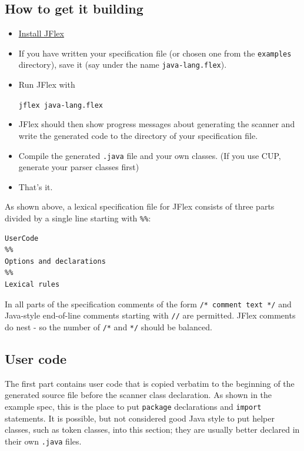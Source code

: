 \subsection{How to get it building}\label{how-to-get-it-building}

\begin{itemize}
\item
  \hyperref[Installing]{Install JFlex}
\item
  If you have written your specification file (or chosen one from the
  \texttt{examples} directory), save it (say under the name
  \texttt{java-lang.flex}).
\item
  Run JFlex with

  \texttt{jflex\ java-lang.flex}
\item
  JFlex should then show progress messages about generating the scanner
  and write the generated code to the directory of your specification
  file.
\item
  Compile the generated \texttt{.java} file and your own classes. (If
  you use CUP, generate your parser classes first)
\item
  That's it.
\end{itemize}


As shown above, a lexical specification file for JFlex consists of three
parts divided by a single line starting with \texttt{\%\%}:

\begin{verbatim}
UserCode
%%
Options and declarations
%%
Lexical rules
\end{verbatim}

In all parts of the specification comments of the form
\texttt{/*\ comment\ text\ */} and Java-style end-of-line comments
starting with \texttt{//} are permitted. JFlex comments do nest - so the
number of \texttt{/*} and \texttt{*/} should be balanced.

\subsection{User code}\label{user-code}

The first part contains user code that is copied verbatim to the
beginning of the generated source file before the scanner class
declaration. As shown in the example spec, this is the place to put
\texttt{package} declarations and \texttt{import} statements. It is
possible, but not considered good Java style to put helper classes, such
as token classes, into this section; they are usually better declared in
their own \texttt{.java} files.

